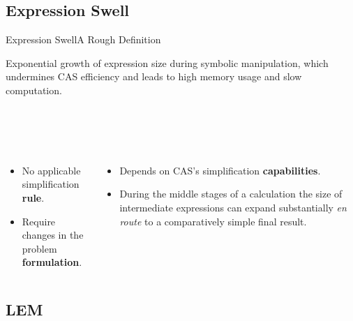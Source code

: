 \subsection{Expression Swell}

\begin{frame}{Expression Swell}{A Rough Definition}
  \begin{bbox}
    Exponential growth of expression size during symbolic manipulation, which undermines \ac{CAS} efficiency and leads to high memory usage and slow computation.
  \end{bbox}
  \vspace{0.5em}
   \\
  \begin{columns}
    \begin{column}[t]{0.5\textwidth}
       \\
      \begin{itemize}\small
        \item No applicable simplification \textbf{rule}.
        \item Require changes in the problem \textbf{formulation}.
      \end{itemize}
    \end{column}
    \begin{column}[t]{0.5\textwidth}
       \\
      \begin{itemize}\small
        \item Depends on \ac{CAS}'s simplification \textbf{capabilities}.
        \item During the middle stages of a calculation the size of intermediate expressions can expand substantially \emph{en route} to a comparatively simple final result.
      \end{itemize}
    \end{column}
  \end{columns}
\end{frame}

\subsection{\acl{LEM}}

